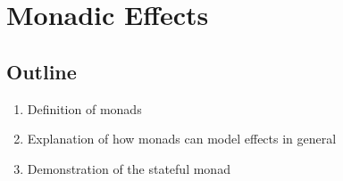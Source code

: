 \chapter{Monadic Effects}

\section{Outline}
\begin{enumerate}
  \item Definition of monads
  \item Explanation of how monads can model effects in general
  \item Demonstration of the stateful monad
\end{enumerate}
